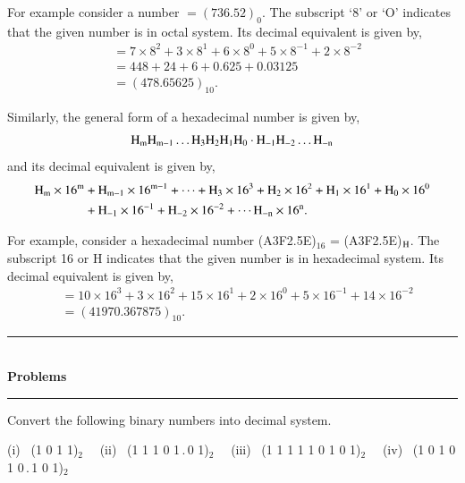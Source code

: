 For example consider a number $=(736.52)_{0}$. The subscript `8' or `O' indicates that the given number is in octal system. Its decimal equivalent is given by,
\begin{align*}
&= 7\times 8^{2}+3\times 8^{1}+6\times 8^{0}+5\times 8^{-1}+2\times 8^{-2}\\
&= 448+24+6+0.625+0.03125\\
&= (478.65625)_{10}.
\end{align*}

Similarly, the general form of a hexadecimal number is given by,
$$
\textrm{H}_{\textrm{m}}\textrm{H}_{\textrm{m}-1}\ldots \textrm{H}_{3}\textrm{H}_{2}\textrm{H}_{1}\textrm{H}_{0}\cdot \textrm{H}_{-1}\textrm{H}_{-2}\ldots \textrm{H}_{-\textrm{n}}
$$
and its decimal equivalent is given by,
\begin{align*}
\textrm{H}_{\textrm{m}}\times 16^{\textrm{m}} &+ \textrm{H}_{\textrm{m}-1}\times 16^{\textrm{m}-1}+\cdots+\textrm{H}_{3}\times 16^{3}+\textrm{H}_{2}\times 16^{2}+\textrm{H}_{1}\times 16^{1}+\textrm{H}_{0}\times 16^{0}\\
&+ \textrm{H}_{-1}\times 16^{-1}+\textrm{H}_{-2}\times 16^{-2}+\cdots \textrm{H}_{-\textrm{n}}\times 16^{\textrm{n}}.
\end{align*}

For example, consider a hexadecimal number (A3F2.5E)$_{16}$ = (A3F2.5E)$_{\textrm{H}}$. The subscript 16 or H indicates that the given number is in hexadecimal system. Its decimal equivalent is given by,
\begin{align*}
&= 10\times 16^{3}+3\times 16^{2}+15\times 16^{1}+2\times 16^{0}+5\times 16^{-1}+14\times 16^{-2}\\
&= (41970.367875)_{10}.
\end{align*}

\begin{center}
\rule{4cm}{1pt}\\
{\bf\Large Problems}\\[-3pt]
\rule{4cm}{1pt}
\end{center}

\begin{problem}\label{prob5.1}
Convert the following binary numbers into decimal system.

\medskip
\noindent
(i)~ (1 0 1 1)$_{2}$\hfil~~ (ii)~ (1 1 1 0 1\,.\,0 1)$_{2}$\hfil~~
(iii)~  (1 1 1 1 1 0 1 0 1)$_{2}$\hfil~~ (iv)~ (1 0 1 0 1 0\,.\,1 0 1)$_{2}$
\end{problem}

